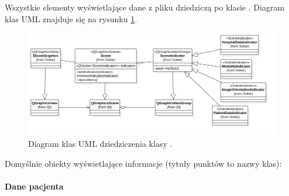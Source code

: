 
\par
Wszystkie elementy wyświetlające dane z pliku \DICOM dziedziczą po klasie .
Diagram klas UML znajduje się na rysunku \ref{uml:sokar-scene-indicators}.

\begin{figure}[!htbp]
    \centering
    \includegraphics[width=\textwidth]{img/uml/dicom-scene-indicators.png}
    \caption{Diagram klas UML dziedziczenia klasy .}
    \label{uml:sokar-scene-indicators}
\end{figure}

\par
Domyślnie obiekty wyświetlające informacje (tytuły punktów to nazwy klas):

\paragraph{Dane pacjenta}


